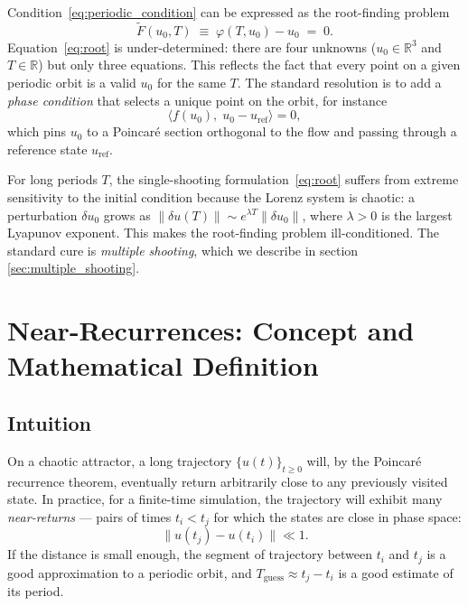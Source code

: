 \documentclass[11pt,a4paper]{article}
\begin{document}
Condition~\eqref{eq:periodic_condition} can be expressed as the root-finding
problem
\begin{equation}\label{eq:root}
  \tilde{F}(u_0, T) \;\equiv\; \varphi(T, u_0) - u_0
  \;=\; 0.
\end{equation}
Equation~\eqref{eq:root} is under-determined: there are four unknowns
($u_0 \in \mathbb{R}^3$ and $T \in \mathbb{R}$) but only three
equations.  This reflects the fact that every point on a given periodic orbit
is a valid $u_0$ for the same $T$.  The standard resolution is to
add a \emph{phase condition} that selects a unique point on the orbit, for
instance
\begin{equation}
  \bigl\langle f(u_0),\; u_0 - u_{\text{ref}} \bigr\rangle = 0,
\end{equation}
which pins $u_0$ to a Poincar\'{e} section orthogonal to the flow
and passing through a reference state $u_{\text{ref}}$.

For long periods $T$, the single-shooting formulation~\eqref{eq:root} suffers
from extreme sensitivity to the initial condition because the Lorenz system
is chaotic: a perturbation $\delta u_0$ grows as
$\|\delta u(T)\| \sim e^{\lambda T} \|\delta u_0\|$, where
$\lambda > 0$ is the largest Lyapunov exponent.  This makes the root-finding
problem ill-conditioned.  The standard cure is \emph{multiple shooting}, which we describe in section \ref{sec:multiple_shooting}.

\section{Near-Recurrences: Concept and Mathematical Definition}

\subsection{Intuition}
On a chaotic attractor, a long trajectory $\{u(t)\}_{t \ge 0}$ will,
by the Poincar\'{e} recurrence theorem, eventually return arbitrarily close
to any previously visited state.  In practice, for a finite-time simulation,
the trajectory will exhibit many \emph{near-returns} --- pairs of times
$t_i < t_j$ for which the states are close in phase space:
\begin{equation}
  \|u(t_j) - u(t_i)\| \ll 1.
\end{equation}
If the distance is small enough, the segment of trajectory between $t_i$ and
$t_j$ is a good approximation to a periodic orbit, and
$T_{\text{guess}} \approx t_j - t_i$ is a good estimate of its period.
\end{document}
